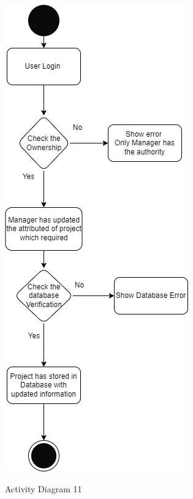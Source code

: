 \begin{figure}[H]
    \centering
    \caption{Activity Diagram 11}
    \includegraphics[scale=0.5]{./diagrams/Activity Diagram/ad-11.png}
    \label{fig:act-11}

\end{figure}


